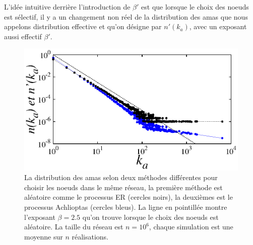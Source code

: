 L'idée intuitive derrière l'introduction de $\beta'$ est que lorsque le choix des noeuds est sélectif, il y a un changement non réel de la distribution des amas que nous appelons distribution effective et qu'on désigne par $n'(k_a)$, avec un exposant aussi effectif $\beta'$. 
\begin{figure}[h!]
	\centering
	\includegraphics[scale=1.2]{./figures/fig-gama2}
	\caption{La distribution des amas selon deux méthodes différentes pour choisir les noeuds dans le même réseau, la première méthode est aléatoire comme le processus ER (cercles noirs), la deuxièmes est le processus Achlioptas \cite{Achlioptas-al2009} (cercles bleus). La ligne en pointillée  montre  l'exposant  $\beta=2.5$ qu'on trouve lorsque le choix des noeuds est aléatoire. La taille du réseau est $n=10^6$, chaque simulation est une moyenne sur $n$ réalisations. }
	\label{gama-5}
\end{figure}
